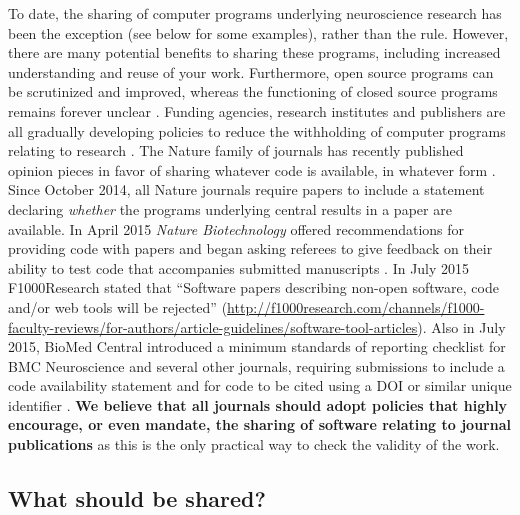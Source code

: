 \documentclass[11pt]{article}
\begin{document}
To date, the sharing of computer programs underlying neuroscience
research has been the exception (see below for some examples), rather
than the rule.  However, there are many potential benefits to sharing
these programs, including increased understanding and reuse of your
work.  Furthermore, open source programs can be scrutinized and
improved, whereas the functioning of closed source programs remains
forever unclear \cite{Vihinen2015}.  Funding agencies, research
institutes and publishers are all gradually developing policies to
reduce the withholding of computer programs relating to research
\cite{Morin2012-65e}.  The Nature family of journals has recently
published opinion pieces in favor of sharing whatever code is
available, in whatever form \cite{Barnes2010-iv,Ince2012-225}.
Since October 2014, all Nature journals require papers to
include a statement declaring \textit{whether} the programs underlying
central results in a paper are available. In April 2015 \textit{Nature
  Biotechnology} offered recommendations for providing code with
papers and began asking referees to give feedback on their ability to
test code that accompanies submitted manuscripts
\cite{NatBiotech2015}.  In July 2015 F1000Research stated that
``Software papers describing non-open software, code and/or web tools
will be rejected''
(\url{http://f1000research.com/channels/f1000-faculty-reviews/for-authors/article-guidelines/software-tool-articles}). Also
in July 2015, BioMed Central introduced a minimum standards of
reporting checklist for BMC Neuroscience and several other journals,
requiring submissions to include a code availability statement and for
code to be cited using a DOI or similar unique identifier
\cite{Kenall2015}.  \textbf{We believe that all journals should adopt
  policies that highly encourage, or even mandate, the sharing of
software relating to journal publications} as this is the only practical 
way to check the validity of the work. 


\subsection*{What should be shared?}
\end{document}
